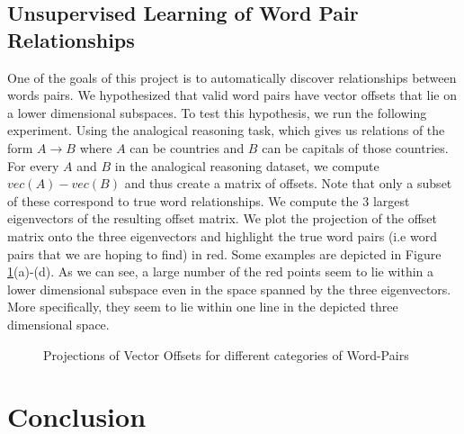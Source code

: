 \documentclass[11pt]{article}
\begin{document}
\subsection{Unsupervised Learning of Word Pair Relationships}
One of the goals of this project is to automatically discover relationships between words pairs. We hypothesized that valid word pairs have vector offsets that lie on a lower dimensional subspaces. To test this hypothesis, we run the following experiment. Using the analogical reasoning task, which gives us relations of the form $A\to B$ where $A$ can be countries and $B$ can be capitals of those countries. For every $A$ and $B$ in the analogical reasoning dataset, we compute $vec(A)-vec(B)$ and thus create a matrix of offsets. Note that only a subset of these correspond to true word relationships. We compute the $3$ largest eigenvectors of the resulting offset matrix. We plot the projection of the offset matrix onto the three eigenvectors and highlight the true word pairs (i.e word pairs that we are hoping to find) in red. Some examples are depicted in Figure \ref{fig:offsetProj}(a)-(d). As we can see, a large number of the red points seem to lie within a lower dimensional subspace even in the space spanned by the three eigenvectors. More specifically, they seem to lie within one line in the depicted three dimensional space. 

\begin{figure}[t]
\centering
{}

\caption{Projections of Vector Offsets for different categories of Word-Pairs}
\label{fig:offsetProj}
\end{figure}

\clearpage

\section{Conclusion}
\nocite{*}


\end{document}
